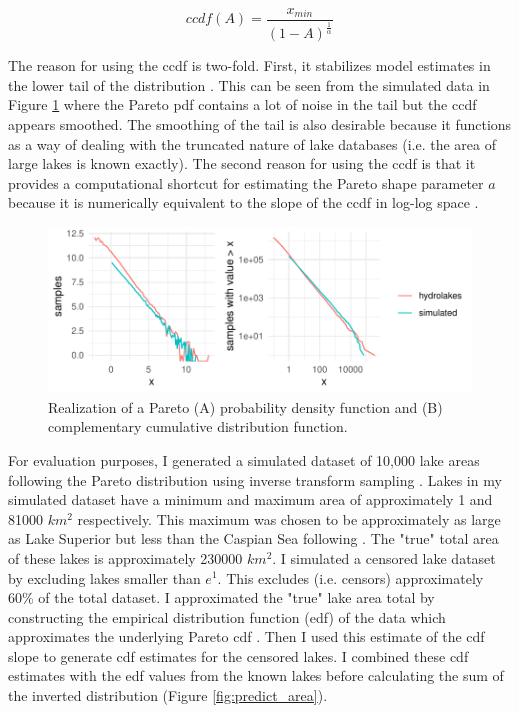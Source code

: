 \documentclass{article}
\begin{document}
\begin{equation}
	ccdf(A) = \frac{x_{min}}{(1-A)^{\frac{1}{\alpha}}}
	\label{eqn:pareto_ccdf}
\end{equation}

The reason for using the ccdf is two-fold. First, it stabilizes model estimates in the lower tail of the distribution \citep{newman_power_2005}. This can be seen from the simulated data in Figure \ref{fig:pareto_demo} where the Pareto pdf contains a lot of noise in the tail but the ccdf appears smoothed. The smoothing of the tail is also desirable because it functions as a way of dealing with the truncated nature of lake databases (i.e. the area of large lakes is known exactly). The second reason for using the ccdf is that it provides a computational shortcut for estimating the Pareto shape parameter $a$ because it is numerically equivalent to the slope of the ccdf in log-log space \citep{downingGlobalAbundanceSize2006}.

\begin{figure}
	\centering
	\includegraphics{figures/pareto_demo-1}
	\caption{Realization of a Pareto (A) probability density function and (B) complementary cumulative distribution function.}
	\label{fig:pareto_demo}
\end{figure}

For evaluation purposes, I generated a simulated dataset of 10,000 lake areas following the Pareto distribution using inverse transform sampling \citep{newman_power_2005}. Lakes in my simulated dataset have a minimum and maximum area of approximately 1 and 81000 $km^2$ respectively. This maximum was chosen to be approximately as large as Lake Superior but less than the Caspian Sea following \citet{lehnerDevelopmentValidationGlobal2004}. The "true" total area of these lakes is approximately 230000 $km^2$. I simulated a censored lake dataset by excluding lakes smaller than $e^{1}$. This excludes (i.e. censors) approximately 60\% of the total dataset. I approximated the "true" lake area total by constructing the empirical distribution function (edf) of the data which approximates the underlying Pareto cdf \citep{newman_power_2005}. Then I used this estimate of the cdf slope to generate cdf estimates for the censored lakes. I combined these cdf estimates with the edf values from the known lakes before calculating the sum of the inverted distribution (Figure \ref{fig:predict_area}).
\end{document}
